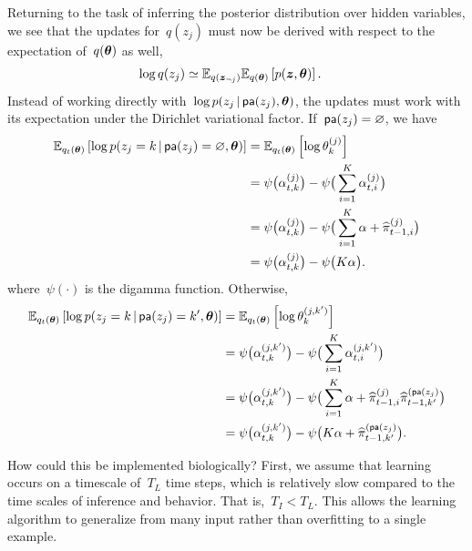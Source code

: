 Returning to the task of inferring the posterior distribution over
hidden variables, we see that the updates for~$q(z_j)$ must now
be derived with respect to the expectation of~$q(\boldsymbol{\theta})$ as well,
\begin{align*}
  \log q(z_j) &\simeq \mathbb{E}_{q(\boldsymbol{z}_{\neg j})} \mathbb{E}_{q(\boldsymbol{\theta})} \left[ p(\boldsymbol{z}, \boldsymbol{\theta}) \right].
\end{align*}
Instead of working directly with~$\log p(z_j \,|\, \mathsf{pa}(z_j), \boldsymbol{\theta})$,
the updates must work with its expectation under the Dirichlet
variational factor. If~$\mathsf{pa}(z_j)=\varnothing$, we have
\begin{align}
  \nonumber
  \mathbb{E}_{q_t(\boldsymbol{\theta})} \left[\log p(z_j=k \,|\, \mathsf{pa}(z_j)=\varnothing, \boldsymbol{\theta})\right]
  &= \mathbb{E}_{q_t(\boldsymbol{\theta})} \left[\log \theta_{k}^{(j)} \right] \\
  \nonumber
  &= \psi\big(\alpha_{t,k}^{(j)}\big)
  - \psi\big(\sum_{i=1}^K \alpha_{t,i}^{(j)} \big) \\
  \nonumber
  &= \psi\big(\alpha_{t,k}^{(j)}\big)
  - \psi\big(\sum_{i=1}^K \alpha + \widehat{\pi}_{t-1,i}^{(j)} \big) \\
  \label{eq:expected_log_theta}
  &= \psi\big(\alpha_{t,k}^{(j)}\big)
  - \psi\big(K\alpha\big).
\end{align}
where~$\psi(\cdot)$ is the digamma function. Otherwise,
\begin{align}
  \nonumber
  \mathbb{E}_{q_t(\boldsymbol{\theta})} \left[\log p(z_j=k \,|\, \mathsf{pa}(z_j)=k', \boldsymbol{\theta})\right]
  &= \mathbb{E}_{q_t(\boldsymbol{\theta})} \left[\log \theta_{k}^{(j,k')} \right] \\
  \nonumber
  &= \psi\big(\alpha_{t,k}^{(j,k')}\big)
  - \psi\big(\sum_{i=1}^K \alpha_{t,i}^{(j,k')} \big) \\
  \nonumber
  &= \psi\big(\alpha_{t,k}^{(j,k')}\big)
  - \psi\big(\sum_{i=1}^K \alpha + \widehat{\pi}_{t-1,i}^{(j)} \widehat{\pi}_{t-1,k'}^{(\mathsf{pa}(z_j)} \big) \\
  \label{eq:expected_log_theta2}
  &= \psi\big(\alpha_{t,k}^{(j,k')}\big)
  - \psi\big(K\alpha + \widehat{\pi}_{t-1,k'}^{(\mathsf{pa}(z_j)} \big).
\end{align}

How could this be implemented biologically?
First, we assume that learning occurs on a 
timescale of~$T_L$ time steps, which is relatively slow compared to
the time scales of inference and behavior. That is,~$T_I < T_L$.
This allows the learning algorithm to generalize from many
input rather than overfitting to a single example.

